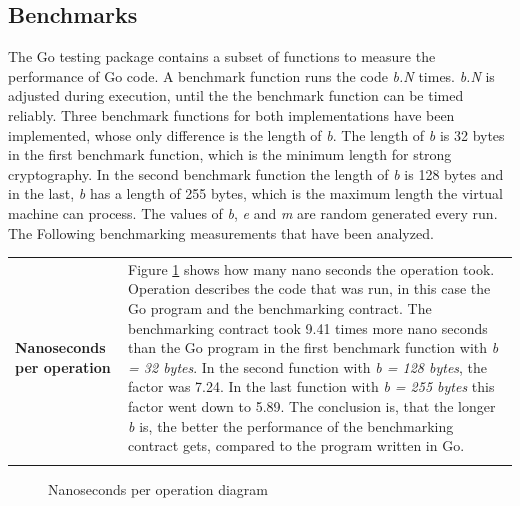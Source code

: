 \subsection{Benchmarks}
The Go testing package contains a subset of functions to measure the performance of Go code. A benchmark function runs the code \textit{b.N} times. \textit{b.N} is adjusted during execution, until the the benchmark function can be timed reliably. \cite{golang_testing} Three benchmark functions for both implementations have been implemented, whose only difference is the length of \textit{b}. The length of \textit{b} is 32 bytes in the first benchmark function, which is the minimum length for strong cryptography. In the second benchmark function the length of \textit{b} is 128 bytes and in the last, \textit{b} has a length of 255 bytes, which is the maximum length the virtual machine can process. The values of \textit{b}, \textit{e} and \textit{m} are random generated every run. The Following benchmarking measurements that have been analyzed. 

\begin{tabular}[t]{ p{3cm} p{12.5cm}}
\raggedright
\textbf{Nanoseconds per operation} &
Figure \ref{nperop} shows how many nano seconds the operation took. Operation describes the code that was run, in this case the Go program and the benchmarking contract. The benchmarking contract took 9.41 times more nano seconds than the Go program in the first benchmark function with \textit{b = 32 bytes}. In the second function with \textit{b = 128 bytes}, the factor was 7.24. In the last function with \textit{b = 255 bytes} this factor went down to 5.89. The conclusion is, that the longer \textit{b} is, the better the performance of the benchmarking contract gets, compared to the program written in Go. \\ \\
\end{tabular}

\begin{figure}[H]
	\begin{center}
	\caption{Nanoseconds per operation diagram}
	\label{nperop}
	\end{center}
\end{figure}


